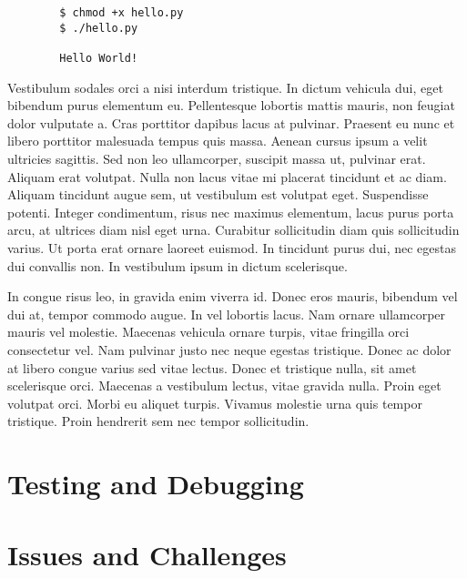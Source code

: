 \documentclass{article}
\begin{document}
\begin{commandline}
	\begin{verbatim}
		$ chmod +x hello.py
		$ ./hello.py

		Hello World!
	\end{verbatim}
\end{commandline}

Vestibulum sodales orci a nisi interdum tristique. In dictum vehicula dui, eget bibendum purus elementum eu. Pellentesque lobortis mattis mauris, non feugiat dolor vulputate a. Cras porttitor dapibus lacus at pulvinar. Praesent eu nunc et libero porttitor malesuada tempus quis massa. Aenean cursus ipsum a velit ultricies sagittis. Sed non leo ullamcorper, suscipit massa ut, pulvinar erat. Aliquam erat volutpat. Nulla non lacus vitae mi placerat tincidunt et ac diam. Aliquam tincidunt augue sem, ut vestibulum est volutpat eget. Suspendisse potenti. Integer condimentum, risus nec maximus elementum, lacus purus porta arcu, at ultrices diam nisl eget urna. Curabitur sollicitudin diam quis sollicitudin varius. Ut porta erat ornare laoreet euismod. In tincidunt purus dui, nec egestas dui convallis non. In vestibulum ipsum in dictum scelerisque.

\begin{warn}[Notice:]
  In congue risus leo, in gravida enim viverra id. Donec eros mauris, bibendum vel dui at, tempor commodo augue. In vel lobortis lacus. Nam ornare ullamcorper mauris vel molestie. Maecenas vehicula ornare turpis, vitae fringilla orci consectetur vel. Nam pulvinar justo nec neque egestas tristique. Donec ac dolor at libero congue varius sed vitae lectus. Donec et tristique nulla, sit amet scelerisque orci. Maecenas a vestibulum lectus, vitae gravida nulla. Proin eget volutpat orci. Morbi eu aliquet turpis. Vivamus molestie urna quis tempor tristique. Proin hendrerit sem nec tempor sollicitudin.
\end{warn}





\section{Testing and Debugging}



\section{Issues and Challenges}
\end{document}
